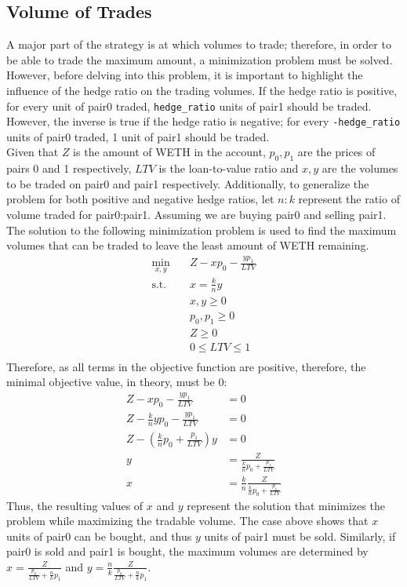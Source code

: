 \subsection{Volume of Trades}
A major part of the strategy is at which volumes to trade; therefore, in order to be able to trade the maximum amount, a minimization problem must be solved. However, before delving into this problem, it is important to highlight the influence of the hedge ratio on the trading volumes. If the hedge ratio is positive, for every unit of pair0 traded, \texttt{hedge\_ratio} units of pair1 should be traded. However, the inverse is true if the hedge ratio is negative; for every \texttt{-hedge\_ratio} units of pair0 traded, 1 unit of pair1 should be traded.
\\[3mm]
Given that $Z$ is the amount of WETH in the account, $p_0, p_1$ are the prices of pairs 0 and 1 respectively, $LTV$ is the loan-to-value ratio and $x, y$ are the volumes to be traded on pair0 and pair1 respectively. Additionally, to generalize the problem for both positive and negative hedge ratios, let $n:k$ represent the ratio of volume traded for pair0:pair1. Assuming we are buying pair0 and selling pair1. The solution to the following minimization problem is used to find the maximum volumes that can be traded to leave the least amount of WETH remaining.
\begin{equation}
\begin{aligned}
\min_{x, y} \quad & Z - xp_0 - \frac{yp_1}{LTV}\\
\textrm{s.t.} \quad & x = \frac{k}{n}y\\
    &x, y \geq 0\\
    &p_0, p_1 \geq 0\\
    &Z \geq 0\\
    &0 \leq LTV \leq 1\\
\end{aligned}
\end{equation}
Therefore, as all terms in the objective function are positive, therefore, the minimal objective value, in theory, must be 0:
\begin{align*}
    Z - xp_0 - \frac{yp_1}{LTV} &= 0\\
    Z - \frac{k}{n}yp_0 - \frac{yp_1}{LTV} &= 0\\
    Z - (\frac{k}{n}p_0 + \frac{p_1}{LTV})y &= 0\\
    y &= \frac{Z}{\frac{k}{n}p_0 + \frac{p_1}{LTV}}\\
    x &= \frac{k}{n}\frac{Z}{\frac{k}{n}p_0 + \frac{p_1}{LTV}}
\end{align*}
\noindent Thus, the resulting values of $x$ and $y$ represent the solution that minimizes the problem while maximizing the tradable volume. The case above shows that $x$ units of pair0 can be bought, and thus $y$ units of pair1 must be sold. Similarly, if pair0 is sold and pair1 is bought, the maximum volumes are determined by $x = \frac{Z}{\frac{p_0}{LTV} + \frac{n}{k}p_1}$ and $y = \frac{n}{k} \frac{Z}{\frac{p_0}{LTV} + \frac{n}{k}p_1}$.

